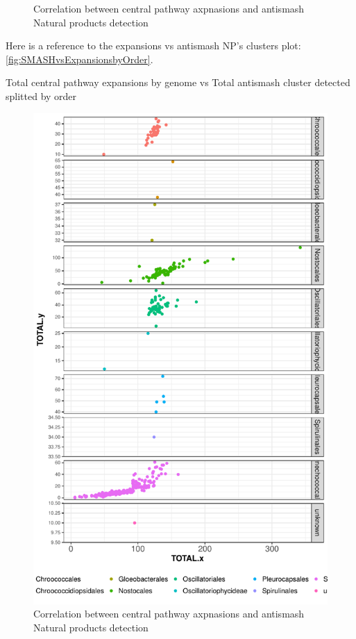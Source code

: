 \documentclass[12pt,twoside]{reedthesis}
\begin{document}
\begin{figure}[h!tbp]
  \caption[Correlation between central pathway axpnasions and antismash Natural products detection]{\normalsize{Correlation between central pathway axpnasions and antismash Natural products detection}}
  \label{fig:SMASHvsExpansionsbyOrder}
  \end{figure}
  
  Here is a reference to the expansions vs antismash NP's clusters plot:
  \autoref{fig:SMASHvsExpansionsbyOrder}. \clearpage 
  
  Total central pathway expansions by genome vs Total antismash cluster
  detected splitted by order
  
  \begin{figure}[h!tbp]
  \centering
  \includegraphics[angle = 0,scale = 0.5]{chapter2/Cyanobacteria/SMASHvsExpansionsbyOrderGRID.pdf}
  \caption[Correlation between central pathway axpnasions and antismash Natural products detection]{\normalsize{Correlation between central pathway axpnasions and antismash Natural products detection}}
  \label{fig:SMASHvsExpansionsbyOrderGRID}
  \end{figure}
  
\end{document}
